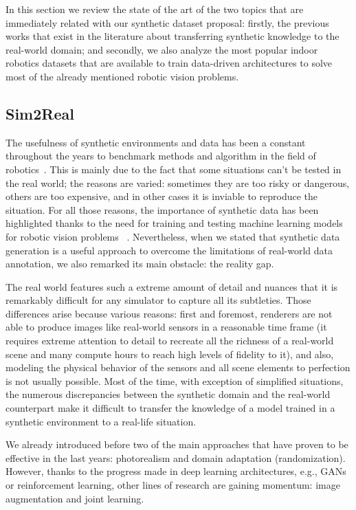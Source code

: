 In this section we review the state of the art of the two topics that are immediately related with our synthetic dataset proposal: firstly, the previous works that exist in the literature about transferring synthetic knowledge to the real-world domain; and secondly, we also analyze the most popular indoor robotics datasets that are available to train data-driven architectures to solve most of the already mentioned robotic vision problems.

\subsection{Sim2Real}

The usefulness of synthetic environments and data has been a constant throughout the years to benchmark methods and algorithm in the field of robotics~\cite{Butler2012}. This is mainly due to the fact that some situations can't be tested in the real world; the reasons are varied: sometimes they are too risky or dangerous, others are too expensive, and in other cases it is inviable to reproduce the situation. For all those reasons, the importance of synthetic data has been highlighted thanks to the need for training and testing machine learning models for robotic vision problems~ \cite{Brodeur2017} \cite{Ros2016} \cite{Mahler2017dex}. Nevertheless, when we stated that synthetic data generation is a useful approach to overcome the limitations of real-world data annotation, we also remarked its main obstacle: the reality gap.

The real world features such a extreme amount of detail and nuances that it is remarkably difficult for any simulator to capture all its subtleties. Those differences arise because various reasons: first and foremost, renderers are not able to produce images like real-world sensors in a reasonable time frame (it requires extreme attention to detail to recreate all the richness of a real-world scene and many compute hours to reach high levels of fidelity to it), and also, modeling the physical behavior of the sensors and all scene elements to perfection is not usually possible. Most of the time, with exception of simplified situations, the numerous discrepancies between the synthetic domain and the real-world counterpart make it difficult to transfer the knowledge of a model trained in a synthetic environment to a real-life situation.

We already introduced before two of the main approaches that have proven to be effective in the last years: photorealism and domain adaptation (randomization). However, thanks to the progress made in deep learning architectures, e.g., \acp{GAN} or reinforcement learning, other lines of research are gaining momentum: image augmentation and joint learning.

